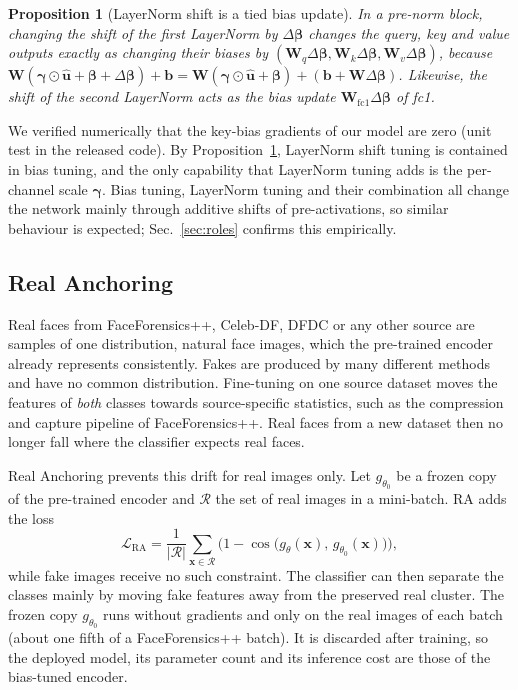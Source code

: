 \documentclass[fonts]{icst}
\newtheorem{proposition}{Proposition}
\begin{document}
\begin{proposition}[LayerNorm shift is a tied bias update]
\label{prop:fold}
In a pre-norm block, changing the shift of the first LayerNorm by $\Delta\boldsymbol{\beta}$ changes the query, key and value outputs exactly as changing their biases by $(\mathbf{W}_q\Delta\boldsymbol{\beta},\mathbf{W}_k\Delta\boldsymbol{\beta},\mathbf{W}_v\Delta\boldsymbol{\beta})$, because $\mathbf{W}(\boldsymbol{\gamma}\odot\hat{\mathbf{u}}+\boldsymbol{\beta}+\Delta\boldsymbol{\beta})+\mathbf{b}=\mathbf{W}(\boldsymbol{\gamma}\odot\hat{\mathbf{u}}+\boldsymbol{\beta})+(\mathbf{b}+\mathbf{W}\Delta\boldsymbol{\beta})$. Likewise, the shift of the second LayerNorm acts as the bias update $\mathbf{W}_{\mathrm{fc1}}\Delta\boldsymbol{\beta}$ of fc1.
\end{proposition}
\label{sec:analysis}
We verified numerically that the key-bias gradients of our model are zero (unit test in the released code). By Proposition~\ref{prop:fold}, LayerNorm shift tuning is contained in bias tuning, and the only capability that LayerNorm tuning adds is the per-channel scale $\boldsymbol{\gamma}$. Bias tuning, LayerNorm tuning and their combination all change the network mainly through additive shifts of pre-activations, so similar behaviour is expected; Sec.~\ref{sec:roles} confirms this empirically.

\subsection{Real Anchoring}
\label{sec:ra}

Real faces from FaceForensics++, Celeb-DF, DFDC or any other source are samples of one distribution, natural face images, which the pre-trained encoder already represents consistently. Fakes are produced by many different methods and have no common distribution. Fine-tuning on one source dataset moves the features of \emph{both} classes towards source-specific statistics, such as the compression and capture pipeline of FaceForensics++. Real faces from a new dataset then no longer fall where the classifier expects real faces.

Real Anchoring prevents this drift for real images only. Let $g_{\theta_0}$ be a frozen copy of the pre-trained encoder and $\mathcal{R}$ the set of real images in a mini-batch. RA adds the loss
\begin{equation}
\mathcal{L}_{\mathrm{RA}}=\frac{1}{|\mathcal{R}|}\sum_{\mathbf{x}\in\mathcal{R}}\Big(1-\cos\big(g_\theta(\mathbf{x}),\,g_{\theta_0}(\mathbf{x})\big)\Big),
\label{eq:ra}
\end{equation}
while fake images receive no such constraint. The classifier can then separate the classes mainly by moving fake features away from the preserved real cluster.
The frozen copy $g_{\theta_0}$ runs without gradients and only on the real images of each batch (about one fifth of a FaceForensics++ batch). It is discarded after training, so the deployed model, its parameter count and its inference cost are those of the bias-tuned encoder.
\end{document}

